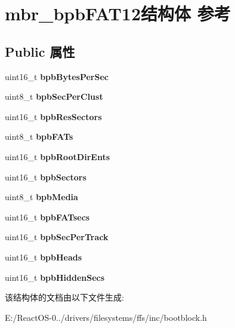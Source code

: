 \hypertarget{structmbr__bpb_f_a_t12}{}\section{mbr\+\_\+bpb\+F\+A\+T12结构体 参考}
\label{structmbr__bpb_f_a_t12}
\subsection*{Public 属性}
\begin{DoxyCompactItemize}
\item 
\mbox{\label{structmbr__bpb_f_a_t12_a62f6ad52031ba2c48fedef0fd6839174}} 
uint16\+\_\+t {\bfseries bpb\+Bytes\+Per\+Sec}
\item 
\mbox{\label{structmbr__bpb_f_a_t12_aab95e9bc0da8cf5fc8cbe097d1987c00}} 
uint8\+\_\+t {\bfseries bpb\+Sec\+Per\+Clust}
\item 
\mbox{\label{structmbr__bpb_f_a_t12_a95d2a320ce9b467016cfa92587983357}} 
uint16\+\_\+t {\bfseries bpb\+Res\+Sectors}
\item 
\mbox{\label{structmbr__bpb_f_a_t12_a5e648971d4367caf9c9f4811845da06a}} 
uint8\+\_\+t {\bfseries bpb\+F\+A\+Ts}
\item 
\mbox{\label{structmbr__bpb_f_a_t12_a8ab59f8a8ecd7e8f5269a3fc4588f9aa}} 
uint16\+\_\+t {\bfseries bpb\+Root\+Dir\+Ents}
\item 
\mbox{\label{structmbr__bpb_f_a_t12_ae6bc8e73377c6d686d9e01cc0fe24c32}} 
uint16\+\_\+t {\bfseries bpb\+Sectors}
\item 
\mbox{\label{structmbr__bpb_f_a_t12_a099e12d5388a8dbad98a3aac4ab570c0}} 
uint8\+\_\+t {\bfseries bpb\+Media}
\item 
\mbox{\label{structmbr__bpb_f_a_t12_a30a44ed9f3f1331cf325a0feeacd7e4d}} 
uint16\+\_\+t {\bfseries bpb\+F\+A\+Tsecs}
\item 
\mbox{\label{structmbr__bpb_f_a_t12_aad80f8b7e9a9530b5ee2d53b20fae2b5}} 
uint16\+\_\+t {\bfseries bpb\+Sec\+Per\+Track}
\item 
\mbox{\label{structmbr__bpb_f_a_t12_a69a235e5db2e65189adee63571d748d4}} 
uint16\+\_\+t {\bfseries bpb\+Heads}
\item 
\mbox{\label{structmbr__bpb_f_a_t12_a900e58159eb97d66a234dfed996f6df4}} 
uint16\+\_\+t {\bfseries bpb\+Hidden\+Secs}
\end{DoxyCompactItemize}


该结构体的文档由以下文件生成\+:\begin{DoxyCompactItemize}
\item 
E\+:/\+React\+O\+S-\/0../drivers/filesystems/ffs/inc/bootblock.\+h\end{DoxyCompactItemize}
